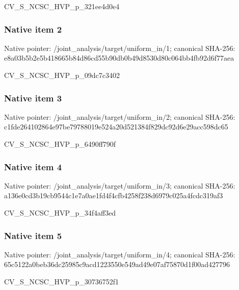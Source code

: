 \documentclass[10pt,a4paper]{article}
\begin{document}
\begingroup\raggedright\sloppy CV\_\allowbreak{}S\_\allowbreak{}NCSC\_\allowbreak{}HVP\_\allowbreak{}p\_\allowbreak{}321ee4d0e4\par\endgroup

\subsubsection{Native item 2}
Native pointer: /joint\_\allowbreak{}analysis/target/uniform\_\allowbreak{}in/1; canonical SHA-256: e8a03b5b2e5b418665b84d86cd55b90db0b49d8530d80c064bb4fb92d6f77aea

\begingroup\raggedright\sloppy CV\_\allowbreak{}S\_\allowbreak{}NCSC\_\allowbreak{}HVP\_\allowbreak{}p\_\allowbreak{}09dc7c3402\par\endgroup

\subsubsection{Native item 3}
Native pointer: /joint\_\allowbreak{}analysis/target/uniform\_\allowbreak{}in/2; canonical SHA-256: c1fde264102864e97be79788019e524a20d521384f829dc92d6e29acc598dc65

\begingroup\raggedright\sloppy CV\_\allowbreak{}S\_\allowbreak{}NCSC\_\allowbreak{}HVP\_\allowbreak{}p\_\allowbreak{}6490ff790f\par\endgroup

\subsubsection{Native item 4}
Native pointer: /joint\_\allowbreak{}analysis/target/uniform\_\allowbreak{}in/3; canonical SHA-256: a136e0cd3b19cb9544c1e7a0ae1fd4f4cfb4258f238d6979c025a4fcdc319af3

\begingroup\raggedright\sloppy CV\_\allowbreak{}S\_\allowbreak{}NCSC\_\allowbreak{}HVP\_\allowbreak{}p\_\allowbreak{}34f4aff3ed\par\endgroup

\subsubsection{Native item 5}
Native pointer: /joint\_\allowbreak{}analysis/target/uniform\_\allowbreak{}in/4; canonical SHA-256: 65c5122a0beb36dc25985c9acd1223550e549ad49e07af75870d1f00ad427796

\begingroup\raggedright\sloppy CV\_\allowbreak{}S\_\allowbreak{}NCSC\_\allowbreak{}HVP\_\allowbreak{}p\_\allowbreak{}30736752f1\par\endgroup
\end{document}
